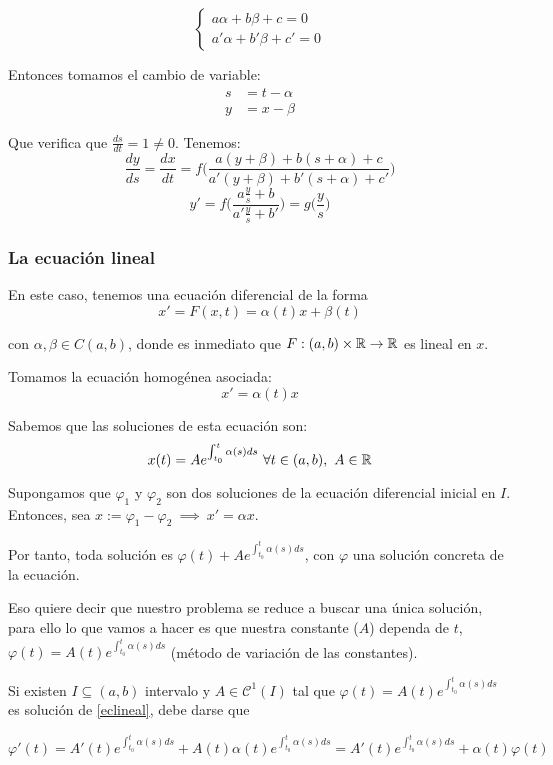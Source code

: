 \[
\begin{cases}
  a\alpha + b\beta + c = 0\\
  a'\alpha + b'\beta + c' = 0
\end{cases}
\]

Entonces tomamos el cambio de variable:
\begin{align*}
s &= t-\alpha \\
y &= x - \beta
\end{align*}

Que verifica que $\frac{ds}{dt} = 1 \ne 0$. Tenemos: 
\[
\frac{dy}{ds} = \frac{dx}{dt} = f\Big( \frac{a(y+\beta ) + b (s+\alpha ) + c}{a'(y+\beta ) + b'(s+ \alpha ) + c'} \Big)
\]
\[
y' = f \bigg( \frac{a \frac{y}{s} + b}{a'\frac{y}{s} + b'} \bigg) = g\Big( \frac{y}{s}\Big)
\]

\subsubsection{La ecuación lineal}

En este caso, tenemos una ecuación diferencial de la forma
\[x' = F(x,t) = \alpha (t)x + \beta ( t) \tag{E} \label{eclineal} \]

con $\alpha , \beta \in C(a,b)$, donde es inmediato que $F:(a,b)\times \mathbb{R} \to \mathbb{R}$ es lineal en $x$.

Tomamos la ecuación homogénea asociada:
\[
x' = \alpha (t) x
\]

Sabemos que las soluciones de esta ecuación son:
\[
x(t) = A e^{\int_{t_0}^{t} \alpha (s) ds}  \ \forall t \in (a,b), \ A \in \R
\]

Supongamos que $\varphi _1$ y $\varphi _2 $ son dos soluciones de la ecuación diferencial inicial en $I$. Entonces, sea $x := \varphi _1  - \varphi _2  \ \implies \ x' = \alpha x$.

Por tanto, toda solución es $\varphi (t) + A e^{\int_{t_0}^{t} \alpha (s) ds}$, con $\varphi$ una solución concreta de la ecuación.

Eso quiere decir que nuestro problema se reduce a buscar una única solución, para ello lo que vamos a hacer es que nuestra constante ($A$) dependa de $t$, $\varphi (t) = A(t) e^{\int_{t_0}^{t} \alpha (s) ds}$ (método de variación de las constantes).

Si existen $I \subseteq (a,b)$ intervalo y $A \in \mathscr{C}^1(I)$ tal que
$\varphi(t) = A(t) e^{\int_{t_0}^t \alpha(s)ds}$ es solución de \eqref{eclineal}, debe darse que

\[
 \varphi'(t) = A'(t)e^{\int_{t_0}^t \alpha(s) ds} + A(t)\alpha(t)e^{\int_{t_0}^t \alpha(s) ds} = A'(t)e^{\int_{t_0}^t \alpha(s) ds} + \alpha(t)\varphi(t)
 \]

